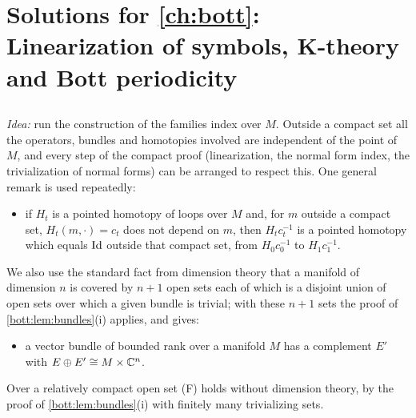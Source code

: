 \providecommand{\Ginf}{G^{-\infty}}
\providecommand{\GinfT}{G^{-\infty}_{\mathcal{T}}}
\providecommand{\GT}{G^{0}_{\mathcal{T}}}
\providecommand{\PsiT}[1]{\Psi^{#1}_{\mathcal{T}}}
\providecommand{\Cp}{\mathcal{C}^\infty_+}
\providecommand{\Kc}{K_{\mathrm{c}}}
\providecommand{\wind}{\operatorname{wind}}
\providecommand{\Iso}{\operatorname{Iso}}
\providecommand{\rank}{\operatorname{rank}}
\providecommand{\Gres}{G^{-\infty}_{\mathrm{iso}}}
\providecommand{\Psiisoph}[1]{\Psi^{#1}_{\mathrm{iso,ph}}}
\providecommand{\OpW}{\operatorname{Op}^{\mathrm{W}}}
\providecommand{\indiso}{\operatorname{ind}_{\mathrm{iso}}}
\providecommand{\Indsl}[1]{\operatorname{Ind}^{#1}_{\mathrm{sl}}}
\providecommand{\ann}{\mathfrak{a}}

\section{Solutions for \cref{ch:bott}: Linearization of symbols, K-theory and Bott periodicity}\label{solutions:bott}

\subsection*{}
\emph{Idea:} run the construction of the families index over $M$. Outside a compact set
all the operators, bundles and homotopies involved are independent of the point of $M$,
and every step of the compact proof (linearization, the normal form index, the
trivialization of normal forms) can be arranged to respect this. One general remark is
used repeatedly:
\begin{itemize}
\item[(P)] if $H_t$ is a pointed homotopy of loops over $M$ and, for $m$ outside a
  compact set, $H_t(m,\cdot)=c_t$ does not depend on $m$, then $H_tc_t^{-1}$ is a
  pointed homotopy which equals $\operatorname{Id}$ outside that compact set, from $H_0c_0^{-1}$ to
  $H_1c_1^{-1}$.
\end{itemize}
We also use the standard fact from dimension theory that a manifold of dimension $n$ is
covered by $n+1$ open sets each of which is a disjoint union of open sets over which a
given bundle is trivial; with these $n+1$ sets the proof of \cref{bott:lem:bundles}(i)
applies, and gives:
\begin{itemize}
\item[(F)] a vector bundle of bounded rank over a manifold $M$ has a complement $E'$ with
  $E\oplus E'\cong M\times\mathbb{C}^n$.
\end{itemize}
Over a relatively compact open set (F) holds without dimension theory, by the proof of
\cref{bott:lem:bundles}(i) with finitely many trivializing sets.

